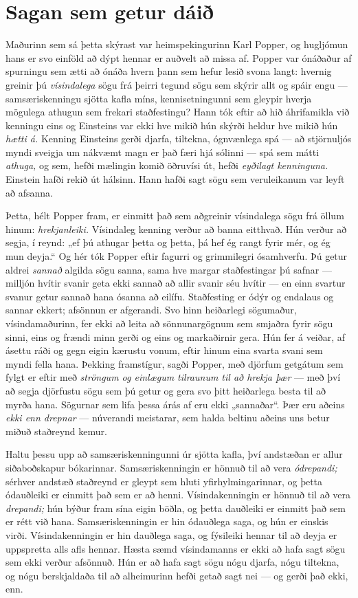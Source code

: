 \section*{Sagan sem getur dáið}

Maðurinn sem sá þetta skýrast var heimspekingurinn Karl Popper, og hugljómun hans er svo einföld að dýpt hennar er auðvelt að missa af. Popper var ónáðaður af spurningu sem ætti að ónáða hvern þann sem hefur lesið svona langt: hvernig greinir þú \emph{vísindalega} sögu frá þeirri tegund sögu sem skýrir allt og spáir engu — samsæriskenningu sjötta kafla míns, kennisetningunni sem gleypir hverja mögulega athugun sem frekari staðfestingu? Hann tók eftir að hið áhrifamikla við kenningu eins og Einsteins var ekki hve mikið hún skýrði heldur hve mikið hún \emph{hætti á.} Kenning Einsteins gerði djarfa, tiltekna, ógnvænlega spá — að stjörnuljós myndi sveigja um nákvæmt magn er það færi hjá sólinni — spá sem mátti \emph{athuga,} og sem, hefði mælingin komið öðruvísi út, hefði \emph{eyðilagt kenninguna.} Einstein hafði rekið út hálsinn. Hann hafði sagt sögu sem veruleikanum var leyft að afsanna.

Þetta, hélt Popper fram, er einmitt það sem aðgreinir vísindalega sögu frá öllum hinum: \emph{hrekjanleiki.} Vísindaleg kenning verður að banna eitthvað. Hún verður að segja, í reynd: „ef þú athugar þetta og þetta, þá hef ég rangt fyrir mér, og ég mun deyja.“ Og hér tók Popper eftir fagurri og grimmilegri ósamhverfu. Þú getur aldrei \emph{sannað} algilda sögu sanna, sama hve margar staðfestingar þú safnar — milljón hvítir svanir geta ekki sannað að allir svanir séu hvítir — en einn svartur svanur getur sannað hana ósanna að eilífu. Staðfesting er ódýr og endalaus og sannar ekkert; afsönnun er afgerandi. Svo hinn heiðarlegi sögumaður, vísindamaðurinn, fer ekki að leita að sönnunargögnum sem smjaðra fyrir sögu sinni, eins og frændi minn gerði og eins og markaðirnir gera. Hún fer á veiðar, af ásettu ráði og gegn eigin kærustu vonum, eftir hinum eina svarta svani sem myndi fella hana. Þekking framstígur, sagði Popper, með djörfum getgátum sem fylgt er eftir með \emph{ströngum og einlægum tilraunum til að hrekja þær} — með því að segja djörfustu sögu sem þú getur og gera svo þitt heiðarlega besta til að myrða hana. Sögurnar sem lifa þessa árás af eru ekki „sannaðar“. Þær eru aðeins \emph{ekki enn drepnar} — núverandi meistarar, sem halda beltinu aðeins uns betur miðuð staðreynd kemur.

Haltu þessu upp að samsæriskenningunni úr sjötta kafla, því andstæðan er allur siðaboðskapur bókarinnar. Samsæriskenningin er hönnuð til að vera \emph{ódrepandi;} sérhver andstæð staðreynd er gleypt sem hluti yfirhylmingarinnar, og þetta ódauðleiki er einmitt það sem er að henni. Vísindakenningin er hönnuð til að vera \emph{drepandi;} hún býður fram sína eigin böðla, og þetta dauðleiki er einmitt það sem er rétt við hana. Samsæriskenningin er hin ódauðlega saga, og hún er einskis virði. Vísindakenningin er hin dauðlega saga, og fýsileiki hennar til að deyja er uppspretta alls afls hennar. Hæsta sæmd vísindamanns er ekki að hafa sagt sögu sem ekki verður afsönnuð. Hún er að hafa sagt sögu nógu djarfa, nógu tiltekna, og nógu berskjaldaða til að alheimurinn hefði getað sagt nei — og gerði það ekki, enn.

